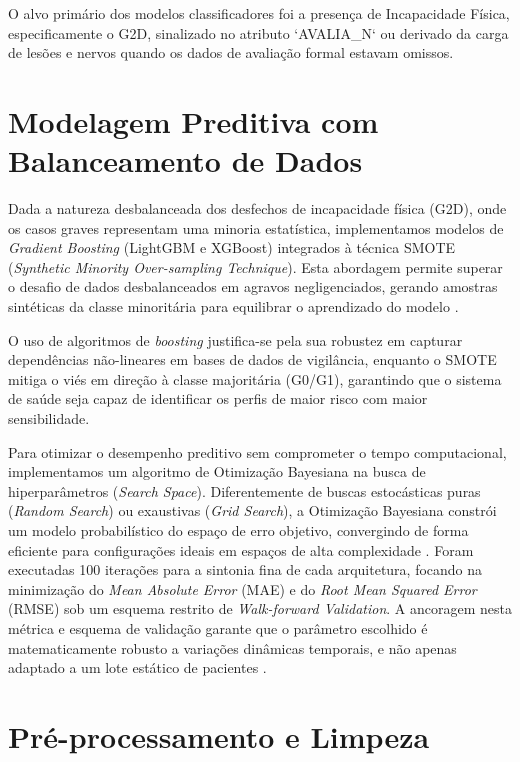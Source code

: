 O alvo primário dos modelos classificadores foi a presença de Incapacidade Física, especificamente o G2D, sinalizado no atributo `AVALIA\_N` ou derivado da carga de lesões e nervos quando os dados de avaliação formal estavam omissos.

\section{Modelagem Preditiva com Balanceamento de Dados}

Dada a natureza desbalanceada dos desfechos de incapacidade física (G2D), onde os casos graves representam uma minoria estatística, implementamos modelos de \textit{Gradient Boosting} (LightGBM e XGBoost) integrados à técnica SMOTE (\textit{Synthetic Minority Over-sampling Technique}). Esta abordagem permite superar o desafio de dados desbalanceados em agravos negligenciados, gerando amostras sintéticas da classe minoritária para equilibrar o aprendizado do modelo \cite{leveraging_xgboost_explainable, seltman2020exploratory}.

O uso de algoritmos de \textit{boosting} justifica-se pela sua robustez em capturar dependências não-lineares em bases de dados de vigilância, enquanto o SMOTE mitiga o viés em direção à classe majoritária (G0/G1), garantindo que o sistema de saúde seja capaz de identificar os perfis de maior risco com maior sensibilidade.

Para otimizar o desempenho preditivo sem comprometer o tempo computacional, implementamos um algoritmo de Otimização Bayesiana na busca de hiperparâmetros (\textit{Search Space}). Diferentemente de buscas estocásticas puras (\textit{Random Search}) ou exaustivas (\textit{Grid Search}), a Otimização Bayesiana constrói um modelo probabilístico do espaço de erro objetivo, convergindo de forma eficiente para configurações ideais em espaços de alta complexidade \cite{bergstra2012random, akiba2019optuna}. Foram executadas 100 iterações para a sintonia fina de cada arquitetura, focando na minimização do \textit{Mean Absolute Error} (MAE) e do \textit{Root Mean Squared Error} (RMSE) sob um esquema restrito de \textit{Walk-forward Validation}. A ancoragem nesta métrica e esquema de validação garante que o parâmetro escolhido é matematicamente robusto a variações dinâmicas temporais, e não apenas adaptado a um lote estático de pacientes \cite{tashman2000forecasting}.

\section{Pré-processamento e Limpeza}

